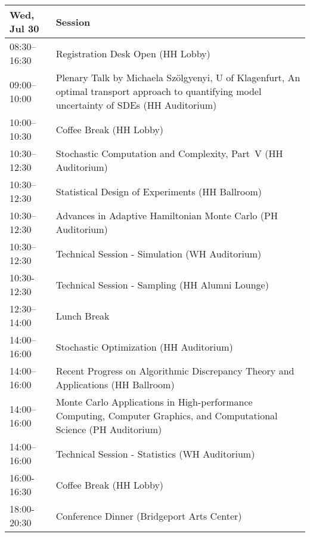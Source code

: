 \begin{table}
{\footnotesize
\begin{tabularx}{\textwidth}{>{\hsize=0.32\hsize}X|>{\hsize=1.7\hsize}X}
\hline
\textbf{Wed, Jul 30} & \textbf{Session} \\
\hline
\cellcolor{\EmptyColor}08:30–16:30 & \cellcolor{\EmptyColor}Registration Desk Open (HH Lobby) \\
\cellcolor{\PlenaryColor}09:00–10:00 & \cellcolor{\PlenaryColor}Plenary Talk by Michaela Szölgyenyi, U of Klagenfurt, An optimal transport approach to quantifying model uncertainty of SDEs (HH Auditorium) \\
\cellcolor{\EmptyColor}10:00–10:30 & \cellcolor{\EmptyColor}Coffee Break (HH Lobby) \\
\cellcolor{\SessionTitleColor}10:30–12:30 & \cellcolor{\SessionTitleColor}Stochastic Computation and Complexity, Part~V (HH Auditorium) \\
\cellcolor{\SessionTitleColor}10:30–12:30 & \cellcolor{\SessionTitleColor}Statistical Design of Experiments (HH Ballroom) \\
\cellcolor{\SessionTitleColor}10:30–12:30 & \cellcolor{\SessionTitleColor}Advances in Adaptive Hamiltonian Monte Carlo (PH Auditorium) \\
\cellcolor{\SessionLightColor}10:30–12:30 & \cellcolor{\SessionLightColor}Technical Session - Simulation (WH Auditorium) \\
\cellcolor{\SessionLightColor}10:30-12:30 & \cellcolor{\SessionLightColor}Technical Session - Sampling (HH Alumni Lounge) \\
\cellcolor{\EmptyColor}12:30–14:00 & \cellcolor{\EmptyColor}Lunch Break \\
\cellcolor{\SessionTitleColor}14:00–16:00 & \cellcolor{\SessionTitleColor}Stochastic Optimization (HH Auditorium) \\
\cellcolor{\SessionTitleColor}14:00–16:00 & \cellcolor{\SessionTitleColor}Recent Progress on Algorithmic Discrepancy Theory and Applications (HH Ballroom) \\
\cellcolor{\SessionTitleColor}14:00–16:00 & \cellcolor{\SessionTitleColor}Monte Carlo Applications in High-performance Computing, Computer Graphics, and Computational Science (PH Auditorium) \\
\cellcolor{\SessionLightColor}14:00–16:00 & \cellcolor{\SessionLightColor}Technical Session - Statistics (WH Auditorium) \\
\cellcolor{\EmptyColor}16:00-16:30 & \cellcolor{\EmptyColor}Coffee Break (HH Lobby) \\
\cellcolor{\EmptyColor}18:00-20:30 & \cellcolor{\EmptyColor}Conference Dinner (Bridgeport Arts Center) \\
\hline
\end{tabularx}
}
\end{table}

